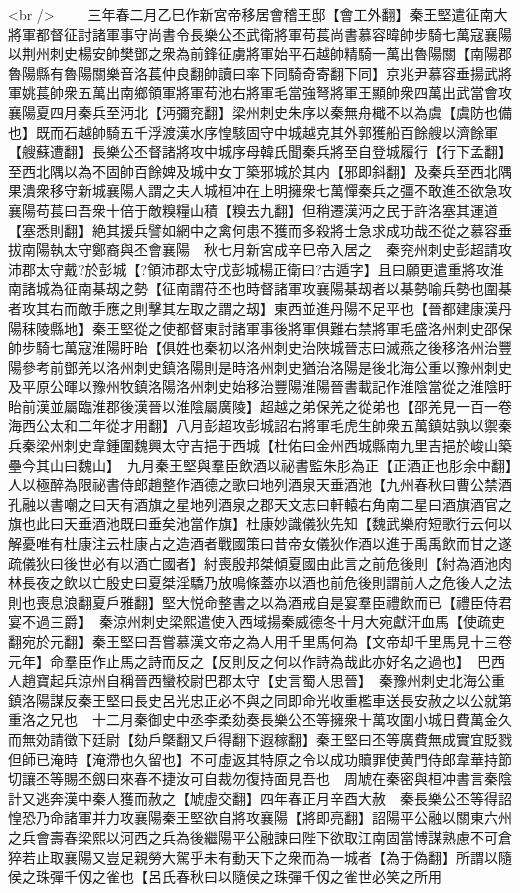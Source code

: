 <br />
　　三年春二月乙巳作新宮帝移居會稽王邸【會工外翻】秦王堅遣征南大將軍都督征討諸軍事守尚書令長樂公丕武衛將軍苟萇尚書慕容暐帥步騎七萬寇襄陽以荆州刺史楊安帥樊鄧之衆為前鋒征虜將軍始平石越帥精騎一萬出魯陽關【南陽郡魯陽縣有魯陽關樂音洛萇仲良翻帥讀曰率下同騎奇寄翻下同】京兆尹慕容垂揚武將軍姚萇帥衆五萬出南鄉領軍將軍苟池右將軍毛當強弩將軍王顯帥衆四萬出武當會攻襄陽夏四月秦兵至沔北【沔彌兖翻】梁州刺史朱序以秦無舟檝不以為虞【虞防也備也】既而石越帥騎五千浮渡漢水序惶駭固守中城越克其外郭獲船百餘艘以濟餘軍【艘蘇遭翻】長樂公丕督諸將攻中城序母韓氏聞秦兵將至自登城履行【行下孟翻】至西北隅以為不固帥百餘婢及城中女丁築邪城於其内【邪即斜翻】及秦兵至西北隅果潰衆移守新城襄陽人謂之夫人城桓冲在上明擁衆七萬憚秦兵之彊不敢進丕欲急攻襄陽苟萇曰吾衆十倍于敵糗糧山積【糗去九翻】但稍遷漢沔之民于許洛塞其運道【塞悉則翻】絶其援兵譬如網中之禽何患不獲而多殺將士急求成功哉丕從之慕容垂拔南陽執太守鄭裔與丕會襄陽　秋七月新宮成辛巳帝入居之　秦兖州刺史彭超請攻沛郡太守戴?於彭城【?領沛郡太守戊彭城楊正衛曰?古遁字】且曰願更遣重將攻淮南諸城為征南棊刼之勢【征南謂苻丕也時督諸軍攻襄陽棊刼者以棊勢喻兵勢也圍棊者攻其右而敵手應之則擊其左取之謂之刼】東西並進丹陽不足平也【晉都建康漢丹陽秣陵縣地】秦王堅從之使都督東討諸軍事後將軍俱難右禁將軍毛盛洛州刺史邵保帥步騎七萬寇淮陽盱眙【俱姓也秦初以洛州刺史治陜城晉志曰滅燕之後移洛州治豐陽參考前鄧羌以洛州刺史鎮洛陽則是時洛州刺史猶治洛陽是後北海公重以豫州刺史及平原公暉以豫州牧鎮洛陽洛州刺史始移治豐陽淮陽晉書載記作淮陰當從之淮陰盱眙前漢並屬臨淮郡後漢晉以淮陰屬廣陵】超越之弟保羌之從弟也【邵羌見一百一卷海西公太和二年從才用翻】八月彭超攻彭城詔右將軍毛虎生帥衆五萬鎮姑孰以禦秦兵秦梁州刺史韋鍾圍魏興太守吉挹于西城【杜佑曰金州西城縣南九里吉挹於峻山築壘今其山曰魏山】　九月秦王堅與羣臣飲酒以祕書監朱肜為正【正酒正也肜余中翻】人以極醉為限祕書侍郎趙整作酒德之歌曰地列酒泉天垂酒池【九州春秋曰曹公禁酒孔融以書嘲之曰天有酒旗之星地列酒泉之郡天文志曰軒轅右角南二星曰酒旗酒官之旗也此曰天垂酒池既曰垂矣池當作旗】杜康妙識儀狄先知【魏武樂府短歌行云何以解憂唯有杜康注云杜康占之造酒者戰國策曰昔帝女儀狄作酒以進于禹禹飲而甘之遂疏儀狄曰後世必有以酒亡國者】紂喪殷邦桀傾夏國由此言之前危後則【紂為酒池肉林長夜之飲以亡殷史曰夏桀淫驕乃放鳴條蓋亦以酒也前危後則謂前人之危後人之法則也喪息浪翻夏戶雅翻】堅大悦命整書之以為酒戒自是宴羣臣禮飲而已【禮臣侍君宴不過三爵】　秦涼州刺史梁熙遣使入西域揚秦威德冬十月大宛獻汗血馬【使疏吏翻宛於元翻】秦王堅曰吾嘗慕漢文帝之為人用千里馬何為【文帝却千里馬見十三卷元年】命羣臣作止馬之詩而反之【反則反之何以作詩為哉此亦好名之過也】　巴西人趙寶起兵涼州自稱晉西蠻校尉巴郡太守【史言蜀人思晉】　秦豫州刺史北海公重鎮洛陽謀反秦王堅曰長史呂光忠正必不與之同即命光收重檻車送長安赦之以公就第重洛之兄也　十二月秦御史中丞李柔劾奏長樂公丕等擁衆十萬攻圍小城日費萬金久而無効請徵下廷尉【劾戶槩翻又戶得翻下遐稼翻】秦王堅曰丕等廣費無成實宜貶戮但師已淹時【淹滯也久留也】不可虛返其特原之令以成功贖罪使黄門侍郎韋華持節切讓丕等賜丕劔曰來春不捷汝可自裁勿復持面見吾也　周虓在秦密與桓冲書言秦陰計又逃奔漢中秦人獲而赦之【虓虛交翻】四年春正月辛酉大赦　秦長樂公丕等得詔惶恐乃命諸軍并力攻襄陽秦王堅欲自將攻襄陽【將即亮翻】詔陽平公融以關東六州之兵會壽春梁熙以河西之兵為後繼陽平公融諫曰陛下欲取江南固當博謀熟慮不可倉猝若止取襄陽又豈足親勞大駕乎未有動天下之衆而為一城者【為于偽翻】所謂以隨侯之珠彈千仭之雀也【呂氏春秋曰以隨侯之珠彈千仭之雀世必笑之所用